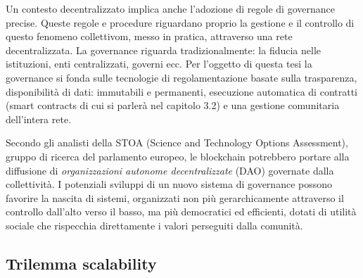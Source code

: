Un contesto decentralizzato implica anche l’adozione di regole di governance precise. Queste regole e procedure riguardano proprio la gestione e il controllo di questo fenomeno collettivom, messo in pratica, attraverso una rete decentralizzata. La governance riguarda tradizionalmente: la fiducia nelle istituzioni, enti centralizzati, governi ecc. Per l’oggetto di questa tesi la governance si fonda sulle tecnologie di regolamentazione basate sulla trasparenza, disponibilità di dati: immutabili e permanenti, esecuzione automatica di contratti (smart contracts di cui si parlerà nel capitolo 3.2) e una gestione comunitaria dell’intera rete.

Secondo gli analisti della STOA (Science and Technology Options Assessment), gruppo di ricerca del parlamento europeo, le blockchain potrebbero portare alla diffusione di \emph{organizzazioni autonome decentralizzate} (DAO) governate dalla collettività. I potenziali sviluppi di un nuovo sistema di governance possono favorire la nascita di sistemi, organizzati non più gerarchicamente attraverso il controllo dall’alto verso il basso, ma più democratici ed efficienti, dotati di utilità sociale che rispecchia direttamente i valori perseguiti dalla comunità.

\subsection{Trilemma scalability}

